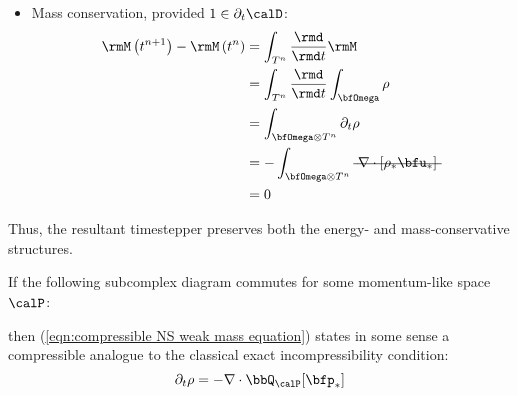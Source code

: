 \begin{itemize}
        \item  Mass conservation, provided $1 \in \partial_{t}\calD$:
        \begin{align}
                \rmM\left(t^{n + 1}\right) - \rmM\left(t^{n}\right)
                &=  \int_{T^{n}}\frac{\rmd}{\rmd t}\rmM  \\
                &=  \int_{T^{n}}\frac{\rmd}{\rmd t}\int_{\bfOmega}\rho  \\
                &=  \int_{\bfOmega\otimes T^{n}}\partial_{t}\rho  \\
                &=  - \int_{\bfOmega\otimes T^{n}}\mst{\nabla\cdot[\rho_{*}\bfu_{*}]}  \\
                &=  0
        \end{align}
    \end{itemize}
    Thus, the resultant timestepper preserves both the energy- and mass-conservative structures.

    \shortline

    If the following subcomplex diagram commutes for some momentum-like space $\calP$:
    \begin{center}\end{center}
    then (\ref{eqn:compressible NS weak mass equation}) states in some sense a compressible analogue to the classical exact incompressibility condition:
    \begin{equation}
        \partial_{t}\rho  =  - \nabla\cdot\bbQ_{\calP}[\bfp_{*}]
    \end{equation}

    \line

